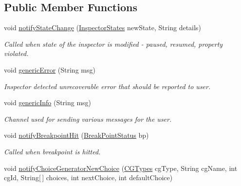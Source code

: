 \subsection*{Public Member Functions}
\begin{DoxyCompactItemize}
\item 
void \hyperlink{classgov_1_1nasa_1_1jpf_1_1inspector_1_1server_1_1callbacks_1_1_callbacks_sender_1_1_callbacks_serializer_a724f27751711165c1062cdb3a76cbd73}{notify\+State\+Change} (\hyperlink{enumgov_1_1nasa_1_1jpf_1_1inspector_1_1interfaces_1_1_commands_interface_1_1_inspector_states}{Inspector\+States} new\+State, String details)
\begin{DoxyCompactList}\small\item\em Called when state of the inspector is modified -\/ paused, resumed, property violated. \end{DoxyCompactList}\item 
void \hyperlink{classgov_1_1nasa_1_1jpf_1_1inspector_1_1server_1_1callbacks_1_1_callbacks_sender_1_1_callbacks_serializer_a893bb1738c37dc0cba354b49faa99eac}{generic\+Error} (String msg)
\begin{DoxyCompactList}\small\item\em Inspector detected unrecoverable error that should be reported to user. \end{DoxyCompactList}\item 
void \hyperlink{classgov_1_1nasa_1_1jpf_1_1inspector_1_1server_1_1callbacks_1_1_callbacks_sender_1_1_callbacks_serializer_a0e7c50fd2c71a1784f6b831c1b9e866d}{generic\+Info} (String msg)
\begin{DoxyCompactList}\small\item\em Channel used for sending various messages for the user. \end{DoxyCompactList}\item 
void \hyperlink{classgov_1_1nasa_1_1jpf_1_1inspector_1_1server_1_1callbacks_1_1_callbacks_sender_1_1_callbacks_serializer_ae60d11cc3bbba13dde00f095f2129bcf}{notify\+Breakpoint\+Hit} (\hyperlink{interfacegov_1_1nasa_1_1jpf_1_1inspector_1_1interfaces_1_1_break_point_status}{Break\+Point\+Status} bp)
\begin{DoxyCompactList}\small\item\em Called when breakpoint is hitted. \end{DoxyCompactList}\item 
void \hyperlink{classgov_1_1nasa_1_1jpf_1_1inspector_1_1server_1_1callbacks_1_1_callbacks_sender_1_1_callbacks_serializer_aee7a8953cff2c17d29923d1267684f0b}{notify\+Choice\+Generator\+New\+Choice} (\hyperlink{enumgov_1_1nasa_1_1jpf_1_1inspector_1_1interfaces_1_1_choice_generators_interface_1_1_c_g_types}{C\+G\+Types} cg\+Type, String cg\+Name, int cg\+Id, String\mbox{[}$\,$\mbox{]} choices, int next\+Choice, int default\+Choice)

\end{DoxyCompactItemize}
